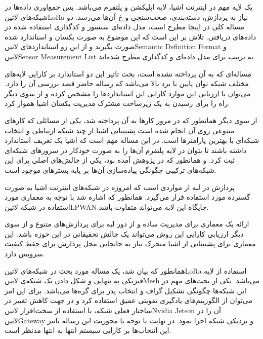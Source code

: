 
یک لایه مهم در اینترنت اشیا، لایه اپلیکشن و پلتفرم می‌باشد. پس جمع‌اوری داده‌ها در شبکه‌های ‌لاتین{LoRa} نیاز به پردازش، دسته‌بندی، صحت‌سنجی و ‌خ
آن‌ها می‌رسد. دو مساله کلی در اینجا مطرح است، مدل داده‌ای سنسور و کدگذاری استفاده شده در داده‌های دریافتی. تلاش بر این است که این موضوع به صورت
یکسان و استاندارد شده صورت بگیرند و از این رو استانداردهای ‌لاتین{Semantic Definition Format} و ‌لاتین{Sensor Measurement List} به ترتیب برای مدل داده‌ای و کدگذاری مطرح شده‌اند.

مساله‌ای که به آن پرداخته نشده است، بحث تاثیر این دو استاندارد بر کارایی لایه‌های مختلف شبکه توان پایین با برد بالا می‌باشد که رساله حاضر قصد بررسی آن را دارد.
می‌توان با ارزیابی این موارد کارایی این استانداردها را مشخص کرده و از سوی دیگر راه را برای رسیدن به یک زیرساخت مشترک مدیریت یکسان اشیا هموار کرد.

از سوی دیگر همانطور که در مرور کارها به آن پرداخته شد، یکی از مسائلی که کارهای متنوعی روی آن انجام شده است پشتیبانی اشیا از چند شبکه ارتباطی و انتخاب شبکه‌ای با بهترین
پارامترها است. در این مساله مهم است که اشیا یک تعریف استاندارد داشته باشند تا بتوان در لایه پلتفرم آن‌ها را به صورت خودکار در سرورهای شبکه‌ای ثبت کرد.
و همانطور که در پژوهش  آمده بود، یکی از چالش‌های اصلی برای این شبکه‌های ترکیبی چگونگی پیاده‌سازی آن‌ها بر پایه بسترهای موجود است.


پردازش در لبه از مواردی است که امروزه در شبکه‌های اینترنت اشیا به صورت گسترده مورد استفاده قرار می‌گیرد.
همانطور که اشاره شد با توجه به معماری مورد استفاده در شبکه ‌لاتین{LPWAN} جایگاه این لابه می‌تواند متفاوت باشد.

ارائه یک معماری برای مدیریت ساده و از دور لبه برای پردازش‌های متنوع و از سوی دیگر ارزیابی کارایی این روش می‌تواند یک چالش تحقیقاتی در این حوزه باشد.
این معماری برای پشتیبانی از اشیا متحرک نیاز به جابجایی محل پردازش برای حفظ کیفیت سرویس دارد.


همانطور که بیان شد، یک مساله مورد بحث در شبکه‌های ‌لاتین{LoRa} استفاده از لایه فیزیکی به تنهایی و شکل دادن یک شبکه‌ی ‌لاتین{Mesh} می‌باشد.
یکی از بحث‌های مهم در این شبکه‌ها چگونگی تشکیل گراف و انتخاب پدر برای گره‌ها می‌باشد. برای این امر می‌توان از الگوریتم‌های یادگیری تقویتی عمیق استفاده کرد
و در جهت کاهش تغییر در ساختار فعلی شبکه، با استفاده از سخت‌افزار ‌لاتین{Nvidia Jetson} آن را در ‌لاتین{Gateway} و نزدیکی شبکه اجرا نمود.
در نهایت با توجه با محوریت این رساله تاثیر این انتخاب‌ها بر کارایی سیستم انتها به انتها مدنظر است.

